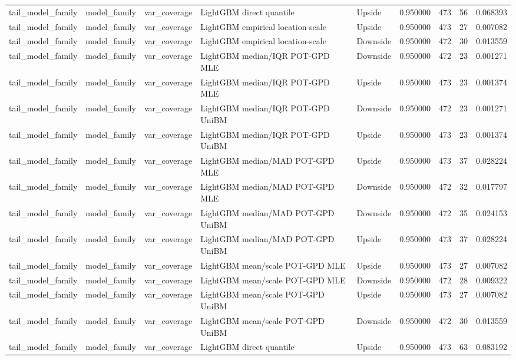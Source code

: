 \begin{tabular}{lllllrrr}
tail\_model\_family & model\_family & var\_coverage & LightGBM direct quantile & Upside & 0.950000 & 473 & 56 & 0.068393 \\
tail\_model\_family & model\_family & var\_coverage & LightGBM empirical location-scale & Upside & 0.950000 & 473 & 27 & 0.007082 \\
tail\_model\_family & model\_family & var\_coverage & LightGBM empirical location-scale & Downside & 0.950000 & 472 & 30 & 0.013559 \\
tail\_model\_family & model\_family & var\_coverage & LightGBM median/IQR POT-GPD MLE & Downside & 0.950000 & 472 & 23 & 0.001271 \\
tail\_model\_family & model\_family & var\_coverage & LightGBM median/IQR POT-GPD MLE & Upside & 0.950000 & 473 & 23 & 0.001374 \\
tail\_model\_family & model\_family & var\_coverage & LightGBM median/IQR POT-GPD UniBM & Downside & 0.950000 & 472 & 23 & 0.001271 \\
tail\_model\_family & model\_family & var\_coverage & LightGBM median/IQR POT-GPD UniBM & Upside & 0.950000 & 473 & 23 & 0.001374 \\
tail\_model\_family & model\_family & var\_coverage & LightGBM median/MAD POT-GPD MLE & Upside & 0.950000 & 473 & 37 & 0.028224 \\
tail\_model\_family & model\_family & var\_coverage & LightGBM median/MAD POT-GPD MLE & Downside & 0.950000 & 472 & 32 & 0.017797 \\
tail\_model\_family & model\_family & var\_coverage & LightGBM median/MAD POT-GPD UniBM & Downside & 0.950000 & 472 & 35 & 0.024153 \\
tail\_model\_family & model\_family & var\_coverage & LightGBM median/MAD POT-GPD UniBM & Upside & 0.950000 & 473 & 37 & 0.028224 \\
tail\_model\_family & model\_family & var\_coverage & LightGBM mean/scale POT-GPD MLE & Upside & 0.950000 & 473 & 27 & 0.007082 \\
tail\_model\_family & model\_family & var\_coverage & LightGBM mean/scale POT-GPD MLE & Downside & 0.950000 & 472 & 28 & 0.009322 \\
tail\_model\_family & model\_family & var\_coverage & LightGBM mean/scale POT-GPD UniBM & Upside & 0.950000 & 473 & 27 & 0.007082 \\
tail\_model\_family & model\_family & var\_coverage & LightGBM mean/scale POT-GPD UniBM & Downside & 0.950000 & 472 & 30 & 0.013559 \\
tail\_model\_family & model\_family & var\_coverage & LightGBM direct quantile & Upside & 0.950000 & 473 & 63 & 0.083192 \\

\end{tabular}
